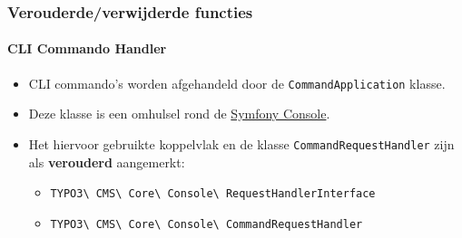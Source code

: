 
\begin{frame}[fragile]
	\frametitle{Verouderde/verwijderde functies}
	\framesubtitle{CLI Commando Handler}

	\begin{itemize}
		\item CLI commando's worden afgehandeld door de \texttt{CommandApplication} klasse.
		\item Deze klasse is een omhulsel rond de
			\href{https://symfony.com/doc/current/components/console.html}{Symfony Console}.

		\item Het hiervoor gebruikte koppelvlak en de klasse \texttt{CommandRequestHandler} zijn als \textbf{verouderd} aangemerkt:

			\begin{itemize}
				\item
					\texttt{TYPO3\textbackslash
						CMS\textbackslash
						Core\textbackslash
						Console\textbackslash
						RequestHandlerInterface}
				\item
					\texttt{TYPO3\textbackslash
						CMS\textbackslash
						Core\textbackslash
						Console\textbackslash
						CommandRequestHandler}
			\end{itemize}

	\end{itemize}

\end{frame}


